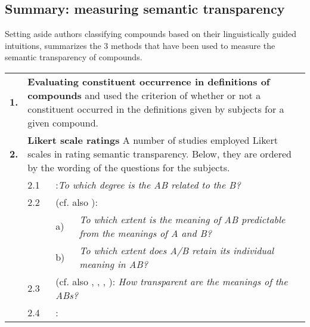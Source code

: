 \subsection{Summary: measuring semantic transparency}
\label{sec:direct_measures}

Setting aside authors classifying compounds based on their linguistically guided
intuitions,  summarizes the 3 methods that have been used to measure the semantic transparency of compounds.
\begin{table}[h]
\small
  \centering
\begin{tabular}{lp{.6cm}lp{10.3cm}}
\lsptoprule
\textbf{1.}&\multicolumn{3}{p{10.9cm}}{\textbf{Evaluating constituent occurrence in definitions of compounds}\newline \citet{Sandra:1990} and \citet{Zwitserlood:1994} used the criterion of whether
or not a constituent occurred in the definitions given by subjects for a given compound.}\\\tablevspace
\textbf{2.}&\multicolumn{3}{p{10.9cm}}{\textbf{Likert scale ratings} \newline A number of studies employed Likert scales in rating semantic
transparency. Below, they are ordered by the wording of the
questions for the subjects.}\\ %
&2.1&\multicolumn{2}{p{10cm}}{\citet{Zwitserlood:1994}:\newline \emph{To which degree is the AB related to the B?}}\\%
&2.2&\multicolumn{2}{p{10cm}}{\citet{Libbenetal:2003} (cf. also \citealt{MarelliandLuzzatti:2012}):}\\
&&a)&\multicolumn{1}{p{9cm}}{\emph{To which extent is the meaning of AB predictable from the meanings of
    A and B?}}\\ 
&&b)&\multicolumn{1}{p{9cm}}{\emph{To which extent does A/B retain its individual meaning in AB?}}\\%
&2.3&\multicolumn{2}{p{10cm}}{\citet{Juhasz:2007} (cf. also \citealt{PollatsekandHyona:2005}, \citealt{Jietal:2011},
\citealt{WongandRotello:2010}, \citealt{PhamandBaayen:2013}):\newline
\emph{How transparent are the meanings of the ABs?} }\\%
&2.4&\multicolumn{2}{p{10cm}}{\citet{Reddyetal:2011}:}\\

\end{tabular}
\end{table}
